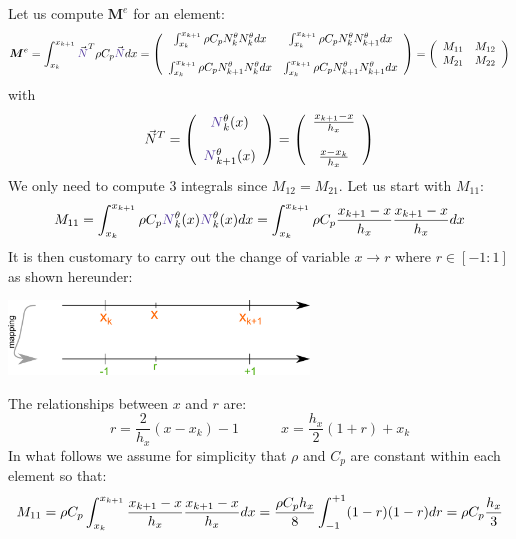 Let us compute ${\bm M}^e$ for an element:
\[
{\bm M}^e
= \int_{x_k}^{x_{k+1}}   {\vec {\color{Violet}N}}^T \rho C_p {\vec {\color{Violet}N}} dx  
=
\left(
\begin{array}{cc}
\int_{x_k}^{x_{k+1}} \rho C_p N_k^\theta N_{k}^\theta dx   &  \int_{x_k}^{x_{k+1}} \rho C_p N_k^\theta N_{k+1}^\theta dx \\ \\
\int_{x_k}^{x_{k+1}} \rho C_p N_{k+1}^\theta N_{k}^\theta dx  &  \int_{x_k}^{x_{k+1}} \rho C_p N_{k+1}^\theta N_{k+1}^\theta dx 
\end{array}
\right)
=
\left(
\begin{array}{cc}
M_{11} & M_{12} \\
M_{21} & M_{22} 
\end{array}
\right)
\]
with 
\[
{\vec N}^T = 
\left(
\begin{array}{c}
{\color{Violet}N}_k^\theta(x)  \\ \\  {\color{Violet}N}_{k+1}^\theta(x)
\end{array}
\right)
=
\left(
\begin{array}{c}
\frac{x_{k+1}-x}{h_x}   \\ \\
\frac{x-x_k}{h_x} 
\end{array}
\right)
\]
We only need to compute 3 integrals since $M_{12}=M_{21}$.
Let us start with $M_{11}$:
\[
M_{11}=\int_{x_k}^{x_{k+1}} \rho C_p {\color{Violet}N}_k^\theta(x) {\color{Violet}N}_{k}^\theta(x) dx
=   
\int_{x_k}^{x_{k+1}} \rho C_p 
\frac{x_{k+1}-x}{h_x}  
\frac{x_{k+1}-x}{h_x}  
dx
\]
It is then customary to carry out the change of variable $x \rightarrow r$ where 
$r \in [-1:1]$ as shown hereunder:
\begin{center}
\includegraphics[width=8cm]{images/oneD/el1D_mapping}
\end{center}
The relationships between $x$ and $r$ are:
\[
r=\frac{2}{h_x}(x-x_k)-1
\quad\quad\quad
x=\frac{h_x}{2}(1+r)+x_k
\]
In what follows we assume for simplicity that $\rho$ and $C_p$ are constant within each element so that:
\[
M_{11}=
\rho C_p
\int_{\tiny x_k}^{x_{k+1}} 
\frac{x_{k+1}-x}{h_x}  
\frac{x_{k+1}-x}{h_x}  
dx
=  \frac{\rho C_p h_x}{8} \int_{-1}^{+1} (1-r) (1-r)  dr  = \rho C_p \frac{h_x}{3} 
\]

